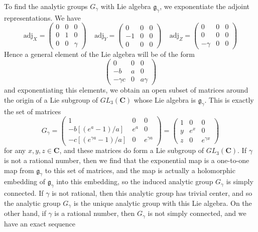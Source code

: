 To find the analytic groups $G_\gamma$ with Lie algebra $\mathfrak{g}_\gamma$, we exponentiate the adjoint representations. We have
%
\[ \text{adj}_X = \begin{pmatrix} 0 & 0 & 0 \\ 0 & 1 & 0 \\ 0 & 0 & \gamma \end{pmatrix}\ \ \ \ \ \text{adj}_Y = \begin{pmatrix} 0 & 0 & 0 \\ -1 & 0 & 0 \\ 0 & 0 & 0 \end{pmatrix}\ \ \ \ \ \text{adj}_Z = \begin{pmatrix} 0 & 0 & 0 \\ 0 & 0 & 0 \\ -\gamma & 0 & 0 \end{pmatrix} \]
%
Hence a general element of the Lie algebra will be of the form
%
\[ \begin{pmatrix} 0 & 0 & 0 \\ -b & a & 0 \\ -\gamma c & 0 & a \gamma \end{pmatrix} \]
%
and exponentiating this elements, we obtain an open subset of matrices around the origin of a Lie subgroup of $GL_3(\mathbf{C})$ whose Lie algebra is $\mathfrak{g}_\gamma$. This is exactly the set of matrices
%
\[ G_\gamma = \begin{pmatrix} 1 & 0 & 0 \\ -b[(e^a - 1)/a] & e^a & 0 \\ -c[(e^{\gamma a} - 1)/a] & 0 & e^{\gamma a} \end{pmatrix} = \begin{pmatrix} 1 & 0 & 0 \\ y & e^x & 0 \\ z & 0 & e^{\gamma x} \end{pmatrix} \]
%
for any $x,y,z \in \mathbf{C}$, and these matrices do form a Lie subgroup of $GL_3(\mathbf{C})$. If $\gamma$ is not a rational number, then we find that the exponential map is a one-to-one map from $\mathfrak{g}_\gamma$ to this set of matrices, and the map is actually a holomorphic embedding of $\mathfrak{g}_\gamma$ into this embedding, so the induced analytic group $G_\gamma$ is simply connected. If $\gamma$ is not rational, then this analytic group has trivial center, and so the analytic group $G_\gamma$ is the unique analytic group with this Lie algebra. On the other hand, if $\gamma$ is a rational number, then $G_\gamma$ is not simply connected, and we have an exact sequence
